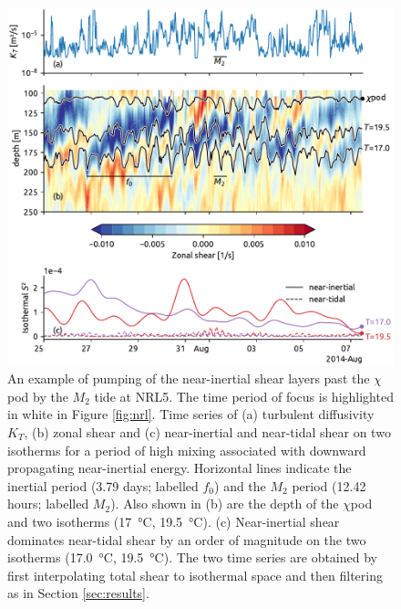 \documentclass[onecol]{ametsoc}
\begin{document}
\begin{figure}
\centering
\includegraphics[width=\textwidth]{figure9-tidal-pumping.pdf}
\caption{\label{fig:nrl5-niw}
An example of pumping of the near-inertial shear layers past the \(\chi\)pod by the \(M_2\) tide at NRL5. The time period of focus is highlighted in white in Figure \ref{fig:nrl}. Time series of (a) turbulent diffusivity \(K_T\), (b) zonal shear and (c) near-inertial and near-tidal shear on two isotherms for a period of high mixing associated with downward propagating near-inertial energy. Horizontal lines indicate the inertial period (3.79 days; labelled \(f_0\)) and the \(M_2\) period (12.42 hours; labelled \(M_2\)). Also shown in (b) are the depth of the \(\chi\)pod and two isotherms (\SI{17}{\celsius}, \SI{19.5}{\celsius}). (c) Near-inertial shear dominates near-tidal shear by an order of magnitude on the two isotherms (\SI{17.0}{\celsius}, \SI{19.5}{\celsius}). The two time series are obtained by first interpolating total shear to isothermal space and then filtering as in Section \ref{sec:results}.}
\end{figure}
\end{document}
